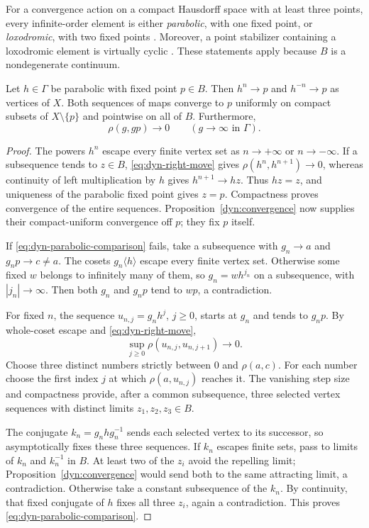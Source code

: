 For a convergence action on a compact Hausdorff space with at least
three points, every infinite-order element is either \emph{parabolic},
with one fixed point, or \emph{loxodromic}, with two fixed points
\cite[Lemma~6.2]{Bowditch1999Treelike}. Moreover, a point stabilizer
containing a loxodromic element is virtually cyclic
\cite[Proposition~6.4 and its preceding paragraph]{Bowditch1999Treelike}.
These statements apply because $B$ is a nondegenerate continuum.

\begin{lemma}\label{dyn:parabolic}
Let $h\in\Gamma$ be parabolic with fixed point $p\in B$. Then
$h^n\to p$ and $h^{-n}\to p$ as vertices of $X$. Both sequences of
maps converge to $p$ uniformly on compact subsets of $X\setminus\{p\}$
and pointwise on all of $B$. Furthermore,
\begin{equation}
 \rho(g,gp)\longrightarrow0\qquad(g\longrightarrow\infty\text{ in }\Gamma).
 \label{eq:dyn-parabolic-comparison}
\end{equation}
\end{lemma}

\begin{proof}
The powers $h^n$ escape every finite vertex set as $n\to+\infty$ or
$n\to-\infty$. If a subsequence tends to $z\in B$,
\eqref{eq:dyn-right-move} gives
$\rho(h^n,h^{n+1})\to0$, whereas continuity of left multiplication by
$h$ gives $h^{n+1}\to hz$. Thus $hz=z$, and uniqueness of the
parabolic fixed point gives $z=p$. Compactness proves convergence of
the entire sequences. Proposition~\ref{dyn:convergence} now supplies
their compact-uniform convergence off $p$; they fix $p$ itself.

If \eqref{eq:dyn-parabolic-comparison} fails, take a subsequence with
$g_n\to a$ and $g_np\to c\ne a$. The cosets $g_n\langle h\rangle$
escape every finite vertex set. Otherwise some fixed $w$ belongs to
infinitely many of them, so $g_n=wh^{j_n}$ on a subsequence, with
$|j_n|\to\infty$. Then both $g_n$ and $g_np$ tend to $wp$, a
contradiction.

For fixed $n$, the sequence $u_{n,j}=g_nh^j$, $j\ge0$, starts at
$g_n$ and tends to $g_np$. By whole-coset escape and
\eqref{eq:dyn-right-move},
\[
 \sup_{j\ge0}\rho(u_{n,j},u_{n,j+1})\longrightarrow0.
\]
Choose three distinct numbers strictly between $0$ and $\rho(a,c)$.
For each number choose the first index $j$ at which
$\rho(a,u_{n,j})$ reaches it. The vanishing step size and compactness
provide, after a common subsequence, three selected vertex sequences
with distinct limits $z_1,z_2,z_3\in B$.

The conjugate $k_n=g_nhg_n^{-1}$ sends each selected vertex to its
successor, so asymptotically fixes these three sequences. If $k_n$
escapes finite sets, pass to limits of $k_n$ and $k_n^{-1}$ in $B$.
At least two of the $z_i$ avoid the repelling limit;
Proposition~\ref{dyn:convergence} would send both to the same
attracting limit, a contradiction. Otherwise take a constant
subsequence of the $k_n$. By continuity, that fixed conjugate of $h$
fixes all three $z_i$, again a contradiction. This proves
\eqref{eq:dyn-parabolic-comparison}.
\end{proof}

